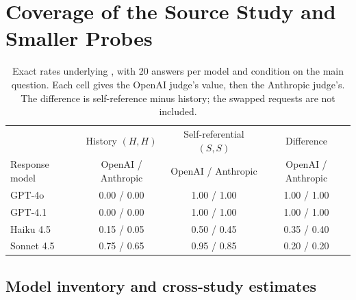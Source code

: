 \documentclass[11pt]{article}
\begin{document}
\section{Coverage of the Source Study and Smaller Probes}\label{app:secondary}

\begin{table}[!htb]
\centering\small
\caption{Exact rates underlying , with 20 answers
per model and condition on the main question. Each cell gives the OpenAI
judge's value, then the Anthropic judge's. The difference is self-reference
minus history; the swapped requests are not included.}
\label{tab:calibration}
\begin{tabular}{@{}lccc@{}}
\toprule
& History $(H,H)$ & Self-referential $(S,S)$ & Difference\\
Response model & {\footnotesize OpenAI / Anthropic} & {\footnotesize OpenAI / Anthropic} & {\footnotesize OpenAI / Anthropic}\\
\midrule
GPT-4o & 0.00 / 0.00 & 1.00 / 1.00 & 1.00 / 1.00\\
GPT-4.1 & 0.00 / 0.00 & 1.00 / 1.00 & 1.00 / 1.00\\
Haiku 4.5 & 0.15 / 0.05 & 0.50 / 0.45 & 0.35 / 0.40\\
Sonnet 4.5 & 0.75 / 0.65 & 0.95 / 0.85 & 0.20 / 0.20\\
\bottomrule
\end{tabular}
\end{table}

\subsection{Model inventory and cross-study estimates}
\label{app:model-inventory}
\end{document}
